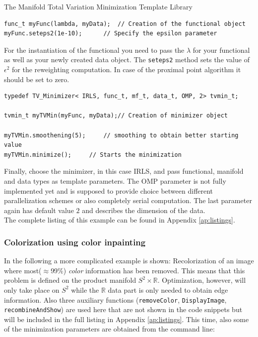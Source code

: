 \begin{chapter}{The Manifold Total Variation Minimization Template Library}
\begin{lstlisting}[label=code:tut_func,caption={Defining the functional and setting parameters}]
func_t myFunc(lambda, myData);  // Creation of the functional object
myFunc.seteps2(1e-10);		// Specify the epsilon parameter 
\end{lstlisting}

For the instantiation of the functional you need to pass the $\lambda$ for your functional as well as your newly created data object. The \texttt{seteps2} method
sets the value of $\epsilon^2$ for the reweighting computation. In case of the proximal point algorithm it should be set to zero.\\

\cppinline
\begin{lstlisting}[label=code:tut_data,caption={Choosing the minimizer, smoothing and minimization}]
typedef TV_Minimizer< IRLS, func_t, mf_t, data_t, OMP, 2> tvmin_t;

tvmin_t myTVMin(myFunc, myData);// Creation of minimizer object

myTVMin.smoothening(5);		// smoothing to obtain better starting value
myTVMin.minimize();		// Starts the minimization
\end{lstlisting}

Finally, choose the minimizer, in this case IRLS, and pass functional, manifold and data types as template parameters. The OMP parameter is not fully implemented yet 
and is supposed to provide choice between different parallelization schemes or also completely serial computation. The last parameter again has default value $2$ and describes the 
dimension of the data.\\
The complete listing of this example can be found in Appendix \ref{ap:listings}.

\subsubsection{Colorization using color inpainting} %
\label{ssub:Color inpainting}
In the following a more complicated example is shown: Recolorization of an image where most($\approx$99\%) \textit{color} information has been removed. This means that this
problem is defined on the product manifold $S^2\times \mathbb{R}$. Optimization, however, will only take place on $S^2$ while the $\mathbb{R}$ data part is only needed to obtain
edge information. Also three auxiliary functions (\texttt{removeColor}, \texttt{DisplayImage}, \texttt{recombineAndShow}) are used here that are not shown in the code snippets but
will be included in the full listing in Appendix \ref{ap:listings}. This time, also some of the minimization parameters 
are obtained from the command line:\\


\end{chapter}
